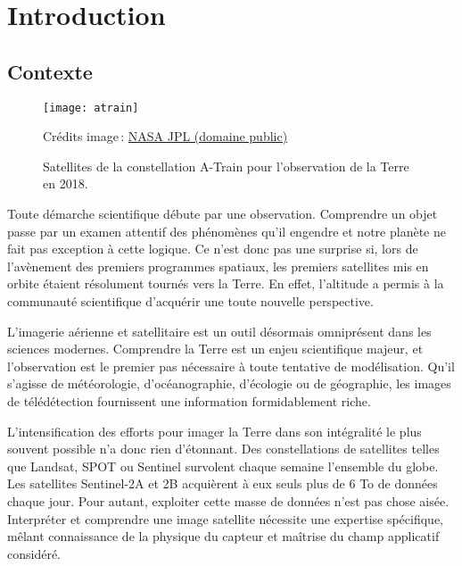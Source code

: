 \chapter{Introduction}
\label{chap:intro}
	\minitoc
	\newpage


\section{Contexte}

\begin{figure}[h]
	\texttt{[image: atrain]}
	\caption{Satellites de la constellation A-Train pour l'observation de la Terre en 2018.}
	{\small Crédits image\,: \href{https://commons.wikimedia.org/w/index.php?curid=33645603}{NASA JPL (domaine public)}}
	\label{fig:atrain}
\end{figure}

Toute démarche scientifique débute par une observation. Comprendre un objet passe par un examen attentif des phénomènes qu'il engendre et notre planète ne fait pas exception à cette logique. Ce n'est donc pas une surprise si, lors de l'avènement des premiers programmes spatiaux, les premiers satellites mis en orbite étaient résolument tournés vers la Terre. En effet, l'altitude a permis à la communauté scientifique d'acquérir une toute nouvelle perspective.

L'imagerie aérienne et satellitaire est un outil désormais omniprésent dans les sciences modernes. Comprendre la Terre est un enjeu scientifique majeur, et l'observation est le premier pas nécessaire à toute tentative de modélisation. Qu'il s'agisse de météorologie, d'océanographie, d'écologie ou de géographie, les images de télédétection fournissent une information formidablement riche.

L'intensification des efforts pour imager la Terre dans son intégralité le plus souvent possible n'a donc rien d'étonnant. Des constellations de satellites telles que \gls{Landsat}, \gls{SPOT} ou \gls{Sentinel} survolent chaque semaine l'ensemble du globe. Les satellites Sentinel-2A et 2B acquièrent à eux seuls plus de 6 To de données chaque jour. Pour autant, exploiter cette masse de données n'est pas chose aisée. Interpréter et comprendre une image satellite nécessite une expertise spécifique, mêlant connaissance de la physique du capteur et maîtrise du champ applicatif considéré.

